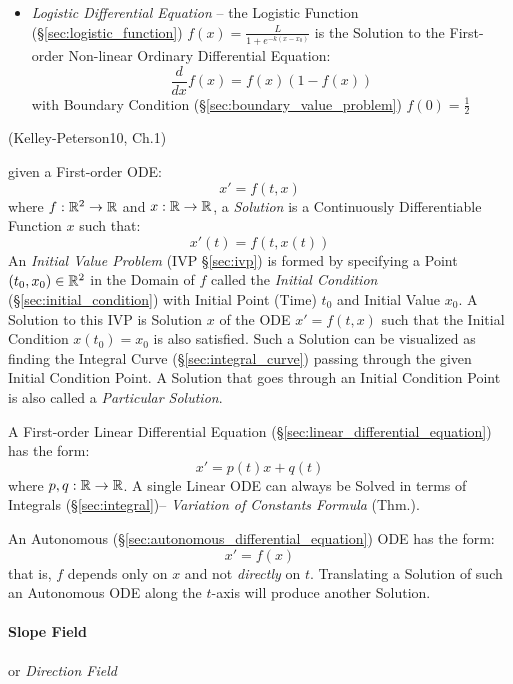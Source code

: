 \asterism

\begin{itemize}
  \item \emph{Logistic Differential Equation} -- the Logistic Function
    (\S\ref{sec:logistic_function}) $f(x) = \frac{L}{1 + e^{-k(x-x_0)}}$ is the
    Solution to the First-order Non-linear Ordinary Differential Equation:
  \[
    \frac{d}{dx}f(x) = f(x)(1 - f(x))
  \]
  with Boundary Condition (\S\ref{sec:boundary_value_problem}) $f(0) =
  \frac{1}{2}$
\end{itemize}

\asterism

(Kelley-Peterson10, Ch.1)

given a First-order ODE:
\[
  x' = f(t,x)
\]
where $f : \mathbb{R}^2 \rightarrow \mathbb{R}$ and $x : \mathbb{R} \rightarrow \mathbb{R}$, a
\emph{Solution} is a Continuously Differentiable Function $x$ such that:
\[
  x'(t) = f(t, x(t))
\]
An \emph{Initial Value Problem} (IVP \S\ref{sec:ivp}) is formed by specifying a
Point $(t_0, x_0) \in \mathbb{R}^2$ in the Domain of $f$ called the \emph{Initial
  Condition} (\S\ref{sec:initial_condition}) with Initial Point (Time) $t_0$ and
Initial Value $x_0$.
A Solution to this IVP is Solution $x$ of the ODE $x' = f(t,x)$ such that the
Initial Condition $x(t_0) = x_0$ is also satisfied. Such a Solution can be
visualized as finding the Integral Curve (\S\ref{sec:integral_curve}) passing
through the given Initial Condition Point.
A Solution that goes through an Initial Condition Point is also called a
\emph{Particular Solution}.

A First-order Linear Differential Equation
(\S\ref{sec:linear_differential_equation}) has the form:
\[
  x' = p(t)x + q(t)
\]
where $p, q: \mathbb{R} \rightarrow \mathbb{R}$.
A single Linear ODE can always be Solved in terms of Integrals
(\S\ref{sec:integral})-- \emph{Variation of Constants Formula} (Thm.).

An Autonomous (\S\ref{sec:autonomous_differential_equation}) ODE has the form:
\[
  x' = f(x)
\]
that is, $f$ depends only on $x$ and not \emph{directly} on $t$. Translating a
Solution of such an Autonomous ODE along the $t$-axis will produce another
Solution.



\paragraph{Slope Field}\label{sec:slope_field}\hfill

or \emph{Direction Field}

